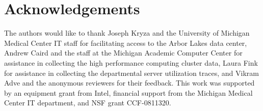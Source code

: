 \section*{Acknowledgements} 

The authors would like to thank Joseph Kryza and the University of Michigan Medical Center IT staff for facilitating access to the Arbor Lakes data center, Andrew Caird and the staff at the Michigan Academic Computer Center for assistance in collecting the high performance computing cluster data, Laura Fink for assistance in collecting the departmental server utilization traces, and Vikram Adve and the anonymous reviewers for their feedback. This work was supported by an equipment grant from Intel, financial support from the Michigan Medical Center IT department, and NSF grant CCF-0811320.
